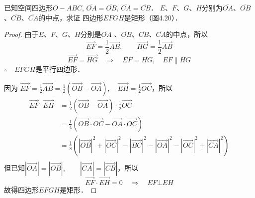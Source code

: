 \begin{figure}[htp]\centering
    \begin{minipage}[t]{0.48\textwidth}
    \centering
{}
    \caption{}
    \end{minipage}
    \begin{minipage}[t]{0.48\textwidth}
    \centering
    \caption{}
    \end{minipage}
    \end{figure}

\begin{example}
    已知空间四边形$O-ABC$, $\overline{OA}=\overline{OB}$, $\overline{CA}=\overline{CB}$．
    $E$、$F$、$G$、$H$分别为$\overline{OA}$、$\overline{OB}$、$\overline{CB}$、$\overline{CA}$的中点，求证
    四边形$EFGH$是矩形（图4.20）．
\end{example}

\begin{proof}
由于$E$、$F$、$G$、$H$分别是$\overline{OA}$
、$\overline{OB}$、$\overline{CB}$、$\overline{CA}$的中点，所以
\[\Vec{EF}=\frac{1}{2}\Vec{AB},\qquad \Vec{HG}=\frac{1}{2}\Vec{AB}\]
\[\Vec{EF}=\Vec{HG}\quad \Rightarrow\quad \overline{EF}=\overline{HG},\quad EF\parallel HG\]
$\therefore\quad EFGH$是平行四边形．

因为
$\Vec{EF}=\frac{1}{2}\Vec{AB}=\frac{1}{2}(\Vec{OB}-\Vec{OA}),\quad \Vec{EH}=\frac{1}{2}\Vec{OC}$，所以
\[\begin{split}
        \Vec{E F} \cdot \Vec{E H} &=\frac{1}{2}(\Vec{O B}-\Vec{O A}) \cdot \frac{1}{2} \Vec{O C} \\
        &=\frac{1}{4}(\Vec{O B} \cdot \Vec{O C}-\Vec{O A} \cdot \Vec{O C}) \\
        &=\frac{1}{8}\left(|\Vec{O B}|^{2}+|\Vec{O C}|^{2}-|\Vec{B C}|^{2}-|\Vec{O A}|^{2}-|\Vec{O C}|^{2}+|\Vec{C A}|^{2}\right) \\
\end{split}\]
但已知$|\Vec{O A}|=|\Vec{O B}|,\qquad |\Vec{C A}|=|\Vec{C B}|$，所以
\[\Vec{E F} \cdot \Vec{E H} =0 \quad \Rightarrow\quad  E F \bot E H\]
故得四边形$EFGH$是矩形．
\end{proof}

